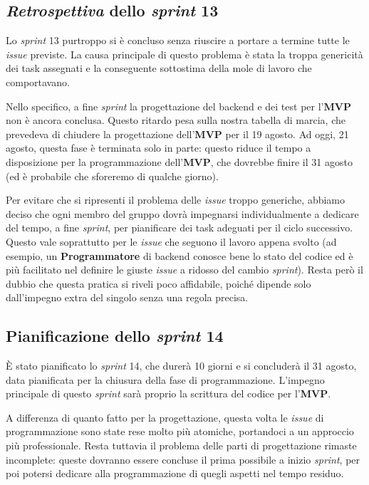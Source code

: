 \documentclass[12pt, a4paper]{article}
\begin{document}
\subsection{\textit{Retrospettiva} dello \textit{sprint} 13}
Lo \textit{sprint} 13 purtroppo si è concluso senza riuscire a portare a termine tutte le \textit{issue} previste. La causa principale di questo problema è stata la troppa genericità dei task assegnati e la conseguente sottostima della mole di lavoro che comportavano. 

Nello specifico, a fine \textit{sprint} la progettazione del backend e dei test per l'\textbf{MVP} non è ancora conclusa. Questo ritardo pesa sulla nostra tabella di marcia, che prevedeva di chiudere la progettazione dell'\textbf{MVP} per il 19 agosto. Ad oggi, 21 agosto, questa fase è terminata solo in parte: questo riduce il tempo a disposizione per la programmazione dell'\textbf{MVP}, che dovrebbe finire il 31 agosto (ed è probabile che sforeremo di qualche giorno).

Per evitare che si ripresenti il problema delle \textit{issue} troppo generiche, abbiamo deciso che ogni membro del gruppo dovrà impegnarsi individualmente a dedicare del tempo, a fine \textit{sprint}, per pianificare dei task adeguati per il ciclo successivo. Questo vale soprattutto per le \textit{issue} che seguono il lavoro appena svolto (ad esempio, un \textbf{Programmatore} di backend conosce bene lo stato del codice ed è più facilitato nel definire le giuste \textit{issue} a ridosso del cambio \textit{sprint}). Resta però il dubbio che questa pratica si riveli poco affidabile, poiché dipende solo dall'impegno extra del singolo senza una regola precisa.

\subsection{Pianificazione dello \textit{sprint} 14}
È stato pianificato lo \textit{sprint} 14, che durerà 10 giorni e si concluderà il 31 agosto, data pianificata per la chiusura della fase di programmazione. L'impegno principale di questo \textit{sprint} sarà proprio la scrittura del codice per l'\textbf{MVP}.

A differenza di quanto fatto per la progettazione, questa volta le \textit{issue} di programmazione sono state rese molto più atomiche, portandoci a un approccio più professionale. Resta tuttavia il problema delle parti di progettazione rimaste incomplete: queste dovranno essere concluse il prima possibile a inizio \textit{sprint}, per poi potersi dedicare alla programmazione di quegli aspetti nel tempo residuo.
\end{document}
